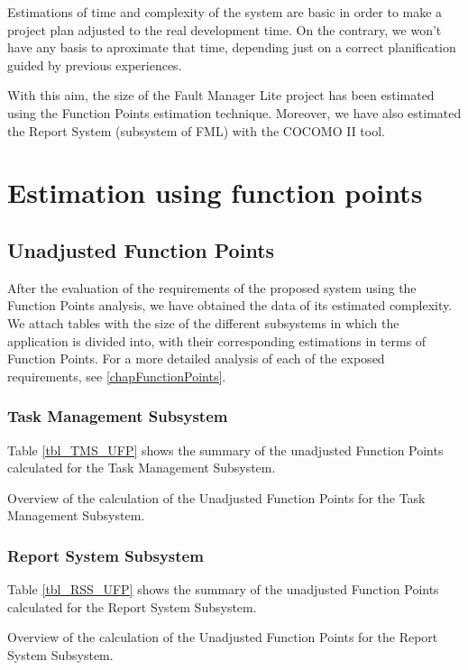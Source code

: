 Estimations of time and complexity of the system are basic in order to make a project plan adjusted to the real development time. On the contrary, we won't have any basis to aproximate that time, depending just on a correct planification guided by previous experiences.

With this aim, the size of the Fault Manager Lite project has been estimated using the Function Points estimation technique. Moreover, we have also estimated the Report System (subsystem of FML) with the COCOMO II tool.

\section{Estimation using function points}
\subsection{Unadjusted Function Points}
After the evaluation of the requirements of the proposed system using the Function Points analysis, we have obtained the data of its estimated complexity. We attach tables with the size of the different subsystems in which the application is divided into, with their corresponding estimations in terms of Function Points. For a more detailed analysis of each of the exposed requirements, see \ref{chapFunctionPoints}.


\subsubsection{Task Management Subsystem}
Table \ref{tbl_TMS_UFP} shows the summary of the unadjusted Function Points calculated for the Task Management Subsystem.
\begin{table}[hbtp]
\centering

\caption{Overview of the calculation of the Unadjusted Function Points for the Task Management Subsystem.}
\label{tbl_TMS_UFP}
\end{table}

\subsubsection{Report System Subsystem}
Table \ref{tbl_RSS_UFP} shows the summary of the unadjusted Function Points calculated for the Report System Subsystem.
\begin{table}[hbtp]
\centering

\caption{Overview of the calculation of the Unadjusted Function Points for the Report System Subsystem.}
\label{tbl_RSS_UFP}
\end{table}

